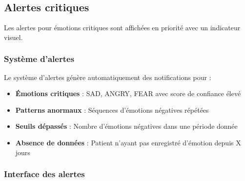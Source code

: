 \documentclass[a4paper,11pt]{report}
\begin{document}
\subsection{Alertes critiques}

Les alertes pour émotions critiques sont affichées en priorité avec un indicateur visuel.

\subsubsection{Système d'alertes}

Le système d'alertes génère automatiquement des notifications pour :
\begin{itemize}
    \item \textbf{Émotions critiques} : SAD, ANGRY, FEAR avec score de confiance élevé
    \item \textbf{Patterns anormaux} : Séquences d'émotions négatives répétées
    \item \textbf{Seuils dépassés} : Nombre d'émotions négatives dans une période donnée
    \item \textbf{Absence de données} : Patient n'ayant pas enregistré d'émotion depuis X jours
\end{itemize}

\subsubsection{Interface des alertes}
\end{document}
